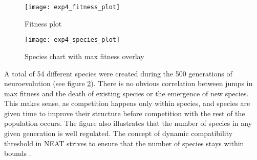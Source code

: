 \begin{figure}[H]
    \centering
    \texttt{[image: exp4\_fitness\_plot]}
    \caption{Fitness plot}
    \label{fig:exp4_fitness_plot}
\end{figure}

\begin{figure}[H]
    \centering
    \texttt{[image: exp4\_species\_plot]}
    \caption{Species chart with max fitness overlay}
    \label{fig:exp4_species_plot}
\end{figure}

A total of 54 different species were created during the 500 generations of neuroevolution (see figure \ref{fig:exp4_species_plot}). There is no obvious correlation between jumps in max fitness and the death of existing species or the emergence of new species. This makes sense, as competition happens only within species, and species are given time to improve their structure before competition with the rest of the population occurs. The figure also illustrates that the number of species in any given generation is well regulated. The concept of dynamic compatibility threshold in NEAT strives to ensure that the number of species stays within bounds \citep{stanley2004}.
